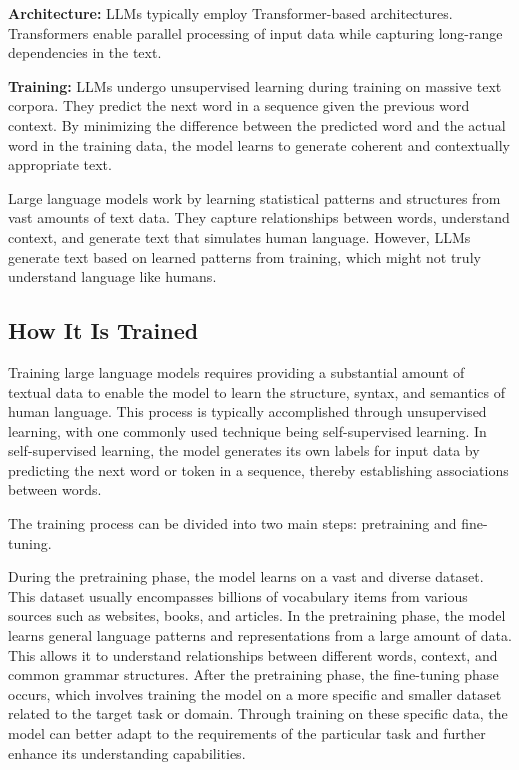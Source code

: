 \documentclass[
]{book}
\begin{document}
\textbf{Architecture:} LLMs typically employ Transformer-based architectures. Transformers enable parallel processing of input data while capturing long-range dependencies in the text.

\textbf{Training:} LLMs undergo unsupervised learning during training on
massive text corpora. They predict the next word in a sequence given the previous word context. By minimizing the difference between the predicted word and the actual word in the training data, the model learns to generate coherent and contextually appropriate text.

Large language models work by learning statistical patterns and
structures from vast amounts of text data. They capture relationships between words, understand context, and generate text that simulates human language. However, LLMs generate text based on learned patterns from training, which might not truly understand language like humans.

\hypertarget{how-it-is-trained}{%
\subsection{How It Is Trained}\label{how-it-is-trained}}

Training large language models requires providing a substantial amount of textual data to enable the model to learn the structure, syntax, and semantics of human language. This process is typically accomplished through unsupervised learning, with one commonly used technique being self-supervised learning. In self-supervised learning, the model generates its own labels for input data by predicting the next word or token in a sequence, thereby establishing associations between words.

The training process can be divided into two main steps: pretraining and fine-tuning.

During the pretraining phase, the model learns on a vast and diverse dataset. This dataset usually encompasses billions of vocabulary items from various sources such as websites, books, and articles. In the pretraining phase, the model learns general language patterns and representations from a large amount of data. This allows it to understand relationships between different words, context, and common grammar structures. After the pretraining phase, the fine-tuning phase occurs, which involves training the model on a more specific and smaller dataset related to the target task or domain. Through training on these specific data, the model can better adapt to the requirements of the particular task and further enhance its understanding capabilities.
\end{document}
